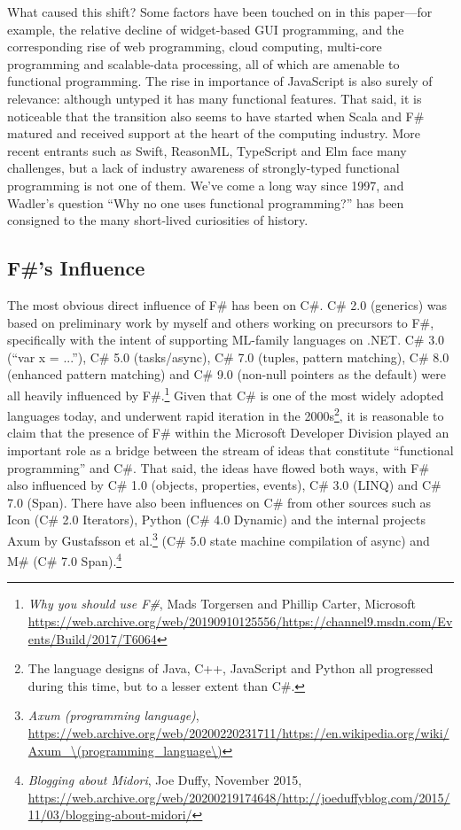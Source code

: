\documentclass[acmsmall]{acmart}\settopmatter{}
\begin{document}
What caused this shift? Some factors have been touched on in this paper---for example, the relative decline of
widget-based GUI programming, and the corresponding rise of web programming, cloud computing, multi-core
programming and scalable-data processing, all of which are amenable to functional programming. The rise in importance
of JavaScript is also surely of relevance: although untyped it has many functional features. That said, it is noticeable
that the transition also seems to have started when Scala and F\# matured and received support at the heart of the
computing industry. More recent entrants such as Swift, ReasonML, TypeScript and Elm face many challenges,
but a lack of industry awareness of strongly-typed functional programming is not one of them. We’ve come a long
way since 1997, and Wadler’s question “Why no one uses functional programming?” has been consigned to the many short-lived curiosities of history.

\subsection*{F\#'s Influence}

The most obvious direct influence of F\# has been on C\#. C\# 2.0 (generics) was based on preliminary work
by myself and others working on precursors to F\#, specifically with the intent of supporting ML-family
languages on .NET. C\# 3.0 (“var x = ...”), C\# 5.0 (tasks/async), C\# 7.0 (tuples, pattern matching),
C\# 8.0 (enhanced pattern matching) and C\# 9.0 (non-null pointers as the default) were all heavily influenced by F\#.\footnote{\textit{Why you should use F\#}, Mads Torgersen and Phillip Carter, Microsoft \url{https://web.archive.org/web/20190910125556/https://channel9.msdn.com/Events/Build/2017/T6064}} Given that C\# is one of
the most widely adopted languages today, and underwent rapid iteration in the 2000s\footnote{The language designs of Java, C++, JavaScript and Python
all progressed during this time, but to a lesser extent than C\#.}, it is reasonable to
claim that the presence of F\# within the Microsoft Developer Division played an important role as a bridge
between the stream of ideas that constitute “functional programming” and C\#.   That said, the ideas have
flowed both ways, with F\# also influenced by C\# 1.0 (objects, properties, events), C\# 3.0 (LINQ) and C\# 7.0 (Span).
There have also been influences on C\# from other sources such as Icon (C\# 2.0 Iterators), Python (C\# 4.0 Dynamic) and
the internal projects Axum by Gustafsson et al.\footnote{\textit{ Axum (programming language)}, \url{https://web.archive.org/web/20200220231711/https://en.wikipedia.org/wiki/Axum\_\(programming_language\)}}  (C\# 5.0 state machine compilation of async) and M\#  (C\# 7.0 Span).\footnote{ \textit{Blogging about Midori}, Joe Duffy, November 2015, \url{https://web.archive.org/web/20200219174648/http://joeduffyblog.com/2015/11/03/blogging-about-midori/}} 
\end{document}
